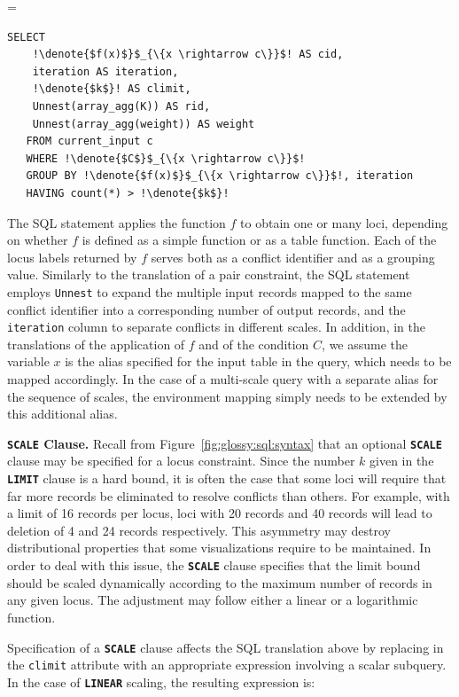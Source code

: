 \documentclass[11pt, oneside]{report}
\newcommand{\minisec}[1]{\noindent\textbf{#1.}}
\newcommand{\denote}[1]{\text{$[\![ $#1$ ]\!]$}}
\begin{document}
{\denote{\lstinline!FOREACH LOCUS MAP BY!$\;f(x)\;$\lstinline!  FILTER BY!$\;C\;$\lstinline!LIMIT !$\;k$} =
\begin{lstlisting}[mathescape,escapechar=!]
   SELECT
    !\denote{$f(x)$}$_{\{x \rightarrow c\}}$! AS cid,
    iteration AS iteration,
    !\denote{$k$}! AS climit,
    Unnest(array_agg(K)) AS rid,
    Unnest(array_agg(weight)) AS weight
   FROM current_input c
   WHERE !\denote{$C$}$_{\{x \rightarrow c\}}$!
   GROUP BY !\denote{$f(x)$}$_{\{x \rightarrow c\}}$!, iteration
   HAVING count(*) > !\denote{$k$}!
\end{lstlisting} 
 
The SQL statement applies the function $f$ to obtain one or many loci, depending on whether $f$ is defined as a simple function or as a table function. Each of the locus labels returned by $f$ serves both as a conflict identifier and as a grouping value. Similarly to the translation of a pair constraint, the SQL statement employs \texttt{Unnest} to expand the multiple input records mapped to the same conflict identifier into a corresponding number of output records, and the \texttt{iteration} column to separate conflicts in different scales. In addition, in the translations of the application of $f$ and of the condition $C$, we assume the variable $x$ is the alias specified for the input table in the query, which needs to be mapped accordingly. In the case of a multi-scale query with a separate alias for the sequence of scales, the environment mapping simply needs to be extended by this additional alias. 

\minisec{\texttt{SCALE} Clause}
Recall from Figure~\ref{fig:glossy:sql:syntax} that an optional \textbf{\texttt{SCALE}} clause may be specified for a locus constraint. Since the number $k$ given in the \textbf{\texttt{LIMIT}} clause is a hard bound, it is often the case that some loci will require that far more records be eliminated to resolve conflicts than others. For example, with a limit of 16 records per locus, loci with 20 records and 40 records will lead to deletion of 4 and 24 records respectively. This asymmetry may destroy distributional properties that some visualizations require to be maintained. In order to deal with this issue, the \textbf{\texttt{SCALE}} clause specifies that the limit bound should be scaled dynamically according to the maximum number of records in any given locus. The adjustment may follow either a linear or a logarithmic function.  

Specification of a \textbf{\texttt{SCALE}} clause affects the SQL translation above by replacing \denote{$k$} in the \texttt{climit} attribute with an appropriate expression involving a scalar subquery. In the case of \textbf{\texttt{LINEAR}} scaling, the resulting expression is:

}
\end{document}
